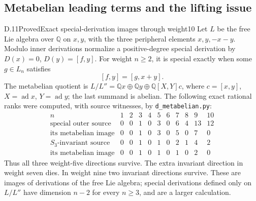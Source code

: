 \subsection{Metabelian leading terms and the lifting issue}

\begin{statement}{D.11}{Proved}{Exact special-derivation images through weight10}
Let $L$ be the free Lie algebra over $\mathbb Q$ on $x,y$, with the three peripheral elements $x,y,-x-y$. Modulo inner derivations normalize a positive-degree special derivation by $D(x)=0$, $D(y)=[f,y]$. For weight $n\geq2$, it is special exactly when some $g\in L_n$ satisfies
\[
 [f,y]=[g,x+y].                                           \tag{D.10}
\]
The metabelian quotient is
$L/L''=\mathbb Qx\oplus\mathbb Qy\oplus\mathbb Q[X,Y]c$, where $c=[x,y]$, $X=\operatorname{ad}x$, $Y=\operatorname{ad}y$; the last summand is abelian. The following exact rational ranks were computed, with source witnesses, by \texttt{d\_metabelian.py}:
\[
\begin{array}{c|rrrrrrrrrr}
n&1&2&3&4&5&6&7&8&9&10\\\hline
\text{special outer source}&0&0&1&0&3&0&6&4&13&12\\
\text{its metabelian image}&0&0&1&0&3&0&5&0&7&0\\
S_3\text{-invariant source}&0&0&1&0&1&0&2&1&4&2\\
\text{its metabelian image}&0&0&1&0&1&0&1&0&2&0
\end{array}                                               \tag{D.11}
\]
Thus all three weight-five directions survive. The extra invariant direction in weight seven dies. In weight nine two invariant directions survive. These are images of derivations of the free Lie algebra; special derivations defined only on $L/L''$ have dimension $n-2$ for every $n\geq3$, and are a larger calculation.
\end{statement}
